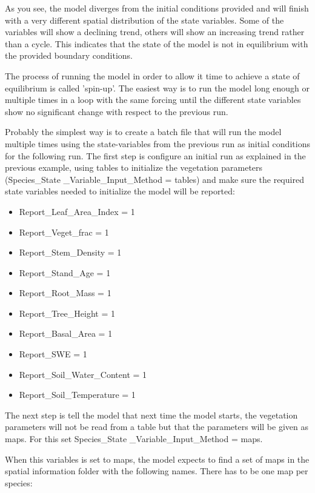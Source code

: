 As you see, the model diverges from the initial conditions provided and will finish with a very different spatial distribution of the state variables. Some of the variables will show a declining trend, others will show an increasing trend rather than a cycle. This indicates that the state of the model is not in equilibrium with the provided boundary conditions.

The process of running the model in order to allow it time to achieve a state of equilibrium is called 'spin-up'. The easiest way is to run the model long enough or multiple times in a loop with the same forcing until the different state variables show no significant change with respect to the previous run.


Probably the simplest way is to create a batch file that will run the model multiple times using the state-variables from the previous run as initial conditions for the following run. The first step is configure an initial run as explained in the previous example, using tables to initialize the vegetation parameters (\textsf{Species\_State \_Variable\_Input\_Method = tables}) and make sure the required state variables needed to initialize the model will be reported:
 
\begin{itemize}

\item Report\_Leaf\_Area\_Index = 1
\item Report\_Veget\_frac = 1
\item Report\_Stem\_Density = 1
\item Report\_Stand\_Age = 1
\item Report\_Root\_Mass = 1
\item Report\_Tree\_Height = 1
\item Report\_Basal\_Area = 1
\item Report\_SWE = 1
\item Report\_Soil\_Water\_Content = 1 
\item Report\_Soil\_Temperature = 1

\end{itemize}

The next step is tell the model that next time the model starts, the vegetation parameters will not be read from a table but that the parameters will be given as maps. For this set \textsf{Species\_State \_Variable\_Input\_Method = maps}.

When this variables is set to \textsf{maps}, the model expects to find a set of maps in the spatial information folder with the following names. There has to be one map per species:

